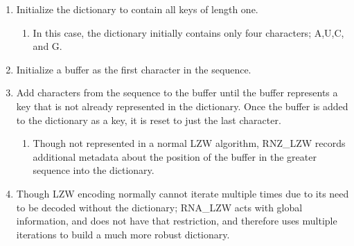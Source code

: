 \documentclass[sigconf]{acmart}
\begin{document}
\begin{enumerate}
\item Initialize the dictionary to contain all keys of length one. 
	\begin{enumerate}
		\item In this case, the dictionary initially contains only four characters; A,U,C, and G. 
	\end{enumerate}
\item Initialize a buffer as the first character in the sequence.
\item Add characters from the sequence to the buffer until the buffer represents a key that is not already represented in the dictionary. Once the buffer is added to the dictionary as a key, it is reset to just the last character.
	\begin{enumerate}
		\item Though not represented in a normal LZW algorithm, RNZ\_LZW records additional metadata about the position of the buffer in the greater sequence into the dictionary.
	\end{enumerate}
\item Though LZW encoding normally cannot iterate multiple times due to its need to be decoded without the dictionary; RNA\_LZW acts with global information, and does not have that restriction, and therefore uses multiple iterations to build a much more robust dictionary.
\end{enumerate}
\end{document}
